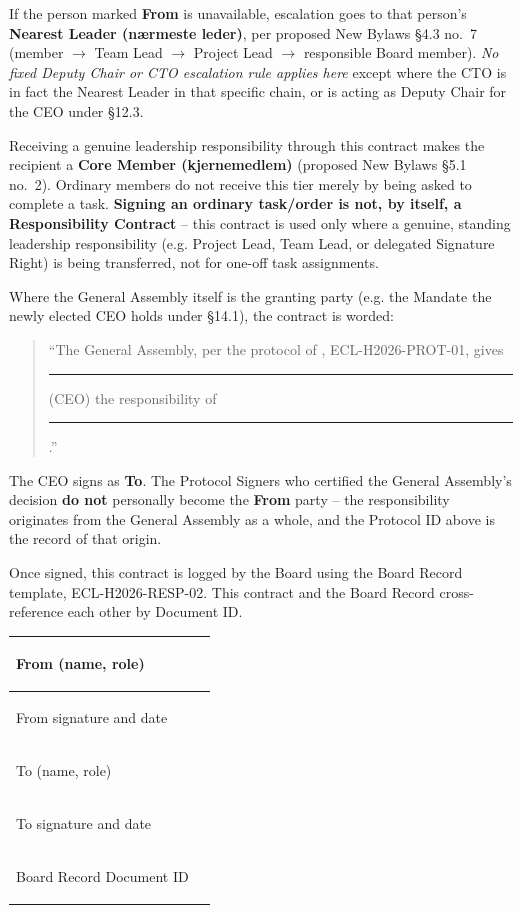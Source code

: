 \documentclass{../../../Common/Latex/Templates/rapport}
\begin{document}
If the person marked \textbf{From} is unavailable, escalation goes to that person's \textbf{Nearest Leader (nærmeste leder)}, per proposed New Bylaws \S4.3 no.\ 7 (member \(\to\) Team Lead \(\to\) Project Lead \(\to\) responsible Board member). \emph{No fixed Deputy Chair or CTO escalation rule applies here} except where the CTO is in fact the Nearest Leader in that specific chain, or is acting as Deputy Chair for the CEO under \S12.3.

Receiving a genuine leadership responsibility through this contract makes the recipient a \textbf{Core Member (kjernemedlem)} (proposed New Bylaws \S5.1 no.\ 2). Ordinary members do not receive this tier merely by being asked to complete a task. \textbf{Signing an ordinary task/order is not, by itself, a Responsibility Contract} -- this contract is used only where a genuine, standing leadership responsibility (e.g. Project Lead, Team Lead, or delegated Signature Right) is being transferred, not for one-off task assignments.

Where the General Assembly itself is the granting party (e.g. the Mandate the newly elected CEO holds under \S14.1), the contract is worded:

\begin{quote}
  ``The General Assembly, per the protocol of \meetingdate, ECL-H2026-PROT-01, gives \rule{3.5cm}{0.4pt} (CEO) the responsibility of \rule{4cm}{0.4pt}.''
\end{quote}

The CEO signs as \textbf{To}. The Protocol Signers who certified the General Assembly's decision \textbf{do not} personally become the \textbf{From} party -- the responsibility originates from the General Assembly as a whole, and the Protocol ID above is the record of that origin.

Once signed, this contract is logged by the Board using the Board Record template, ECL-H2026-RESP-02. This contract and the Board Record cross-reference each other by Document ID.

\begin{tabularx}{\textwidth}{|>{\bfseries\raggedright\arraybackslash}p{4cm}|X|}
  \hline
  From (name, role)        & \rule{0pt}{1.2cm} \\
  \hline
  From signature and date  & \rule{0pt}{1.2cm} \\
  \hline
  To (name, role)          & \rule{0pt}{1.2cm} \\
  \hline
  To signature and date    & \rule{0pt}{1.2cm} \\
  \hline
  Board Record Document ID & \rule{0pt}{1cm}   \\
  \hline
\end{tabularx}
\end{document}
